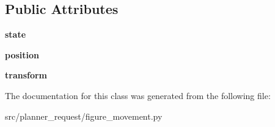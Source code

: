 \subsection*{\-Public \-Attributes}
\begin{DoxyCompactItemize}
\item 
\hypertarget{classplanner__request_1_1figure__movement_1_1_staterobot_ab971293bf4b8759adca9c2f9e2639cec}{{\bfseries state}}\label{classplanner__request_1_1figure__movement_1_1_staterobot_ab971293bf4b8759adca9c2f9e2639cec}

\item 
\hypertarget{classplanner__request_1_1figure__movement_1_1_staterobot_ac7d466f5aacc5888ca1cd4e55c6cf960}{{\bfseries position}}\label{classplanner__request_1_1figure__movement_1_1_staterobot_ac7d466f5aacc5888ca1cd4e55c6cf960}

\item 
\hypertarget{classplanner__request_1_1figure__movement_1_1_staterobot_acc838ec44d758bd2d1572c73c0264caf}{{\bfseries transform}}\label{classplanner__request_1_1figure__movement_1_1_staterobot_acc838ec44d758bd2d1572c73c0264caf}

\end{DoxyCompactItemize}


\-The documentation for this class was generated from the following file\-:\begin{DoxyCompactItemize}
\item 
src/planner\-\_\-request/figure\-\_\-movement.\-py\end{DoxyCompactItemize}
